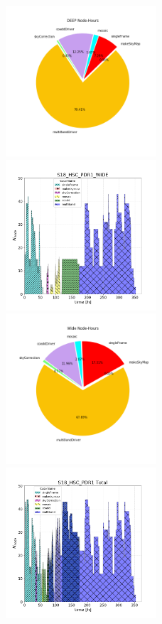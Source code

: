 \begin{figure}[h]
\includegraphics[width=0.50\textwidth]{PDR1_DEEP_pie.png}
\includegraphics[width=0.50\textwidth]{usage-S18_HSC_PDR1_WIDE.png}
\includegraphics[width=0.50\textwidth]{PDR1_Wide_pie.png}
\includegraphics[width=0.50\textwidth]{usage-S18_HSC_PDR1_Total.png}

\end{figure}
